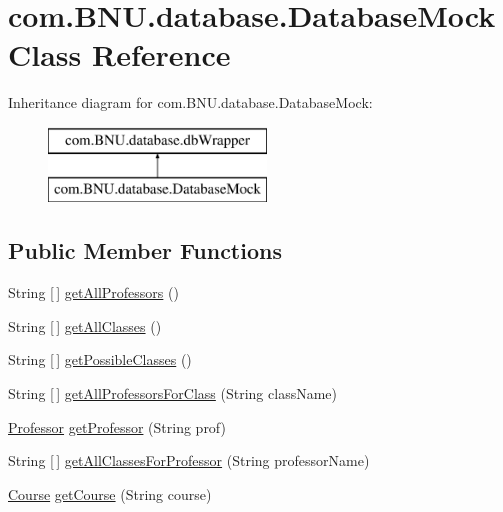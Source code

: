 \hypertarget{classcom_1_1_b_n_u_1_1database_1_1_database_mock}{}\section{com.\+B\+N\+U.\+database.\+Database\+Mock Class Reference}
\label{classcom_1_1_b_n_u_1_1database_1_1_database_mock}
Inheritance diagram for com.\+B\+N\+U.\+database.\+Database\+Mock\+:\begin{figure}[H]
\begin{center}
\leavevmode
\includegraphics[height=2.000000cm]{classcom_1_1_b_n_u_1_1database_1_1_database_mock}
\end{center}
\end{figure}
\subsection*{Public Member Functions}
\begin{DoxyCompactItemize}
\item 
String \mbox{[}$\,$\mbox{]} \mbox{\hyperlink{classcom_1_1_b_n_u_1_1database_1_1_database_mock_a17c12ccb19414dfc1efe7a79005d1ee0}{get\+All\+Professors}} ()
\item 
String \mbox{[}$\,$\mbox{]} \mbox{\hyperlink{classcom_1_1_b_n_u_1_1database_1_1_database_mock_a343bf1389e885f49116eac5f64087b90}{get\+All\+Classes}} ()
\item 
String \mbox{[}$\,$\mbox{]} \mbox{\hyperlink{classcom_1_1_b_n_u_1_1database_1_1_database_mock_a6c43f4a70a1c4c2060b58855ae45257a}{get\+Possible\+Classes}} ()
\item 
String \mbox{[}$\,$\mbox{]} \mbox{\hyperlink{classcom_1_1_b_n_u_1_1database_1_1_database_mock_ad8446bcb76d60c216cae020b0c33ee21}{get\+All\+Professors\+For\+Class}} (String class\+Name)
\item 
\mbox{\hyperlink{classcom_1_1_b_n_u_1_1pages_1_1teachers_by_class_1_1_professor}{Professor}} \mbox{\hyperlink{classcom_1_1_b_n_u_1_1database_1_1_database_mock_a50b0d167f6a5be892b288dd8b34b241a}{get\+Professor}} (String prof)
\item 
String \mbox{[}$\,$\mbox{]} \mbox{\hyperlink{classcom_1_1_b_n_u_1_1database_1_1_database_mock_aa42829abfc5c5186e65f1297523facc7}{get\+All\+Classes\+For\+Professor}} (String professor\+Name)
\item 
\mbox{\hyperlink{classcom_1_1_b_n_u_1_1pages_1_1classes_by_teacher_1_1_course}{Course}} \mbox{\hyperlink{classcom_1_1_b_n_u_1_1database_1_1_database_mock_a0c35cbc9bbb46241d65bbffa50d49b83}{get\+Course}} (String course)
\end{DoxyCompactItemize}


